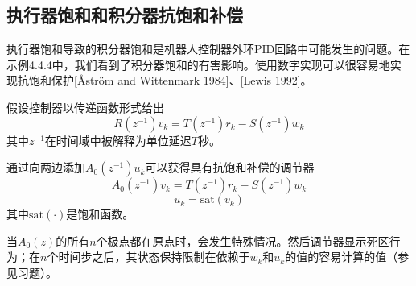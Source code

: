 \documentclass[UTF8]{ctexart}
\theoremstyle{definition}
\begin{document}
\subsection{执行器饱和和积分器抗饱和补偿}

执行器饱和导致的积分器饱和是机器人控制器外环PID回路中可能发生的问题。在示例4.4.4中，我们看到了积分器饱和的有害影响。使用数字实现可以很容易地实现抗饱和保护[Åström and Wittenmark 1984]、[Lewis 1992]。

假设控制器以传递函数形式给出
\begin{equation}
    R(z^{-1})v_k = T(z^{-1})r_k - S(z^{-1})w_k
\end{equation}
其中$z^{-1}$在时间域中被解释为单位延迟$T$秒。

通过向两边添加$A_0(z^{-1})u_k$可以获得具有抗饱和补偿的调节器
\begin{equation}
    A_0(z^{-1})v_k = T(z^{-1})r_k - S(z^{-1})w_k
\end{equation}
\begin{equation}
    u_k = \mathrm{sat}(v_k)
\end{equation}
其中$\mathrm{sat}(\cdot)$是饱和函数。

当$A_0(z)$的所有$n$个极点都在原点时，会发生特殊情况。然后调节器显示死区行为；在$n$个时间步之后，其状态保持限制在依赖于$w_k$和$u_k$的值的容易计算的值（参见习题）。
\end{document}
